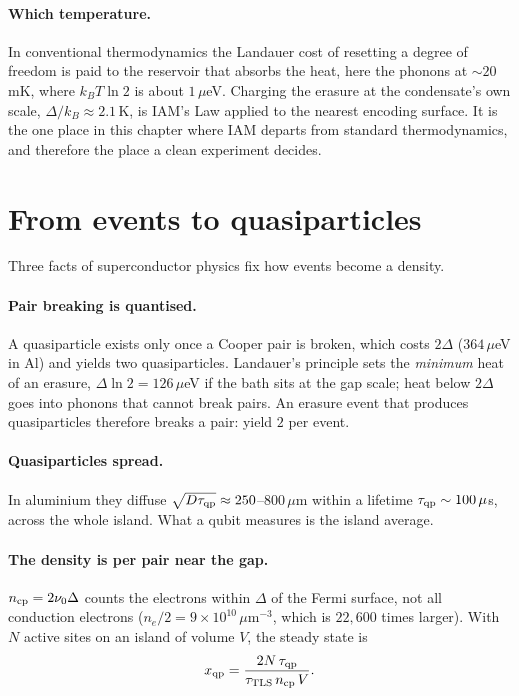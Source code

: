 \paragraph{Which temperature.} In conventional thermodynamics the Landauer cost of resetting a degree of freedom is paid to the reservoir that
absorbs the heat, here the phonons at $\sim20$\,mK, where $k_BT\ln2$ is about $1\,\mu$eV. Charging the erasure at the condensate's own scale,
$\Delta/k_B\approx2.1$\,K, is IAM's Law applied to the nearest encoding surface. It is the one place in this chapter where IAM departs from standard
thermodynamics, and therefore the place a clean experiment decides.

\section{From events to quasiparticles}
Three facts of superconductor physics fix how events become a density.
\paragraph{Pair breaking is quantised.} A quasiparticle exists only once a Cooper pair is broken, which costs $2\Delta$ ($364\,\mu$eV in Al) and yields
two quasiparticles. Landauer's principle sets the \emph{minimum} heat of an erasure, $\Delta\ln2=126\,\mu$eV if the bath sits at the gap scale;
heat below $2\Delta$ goes into phonons that cannot break pairs. An erasure event that produces quasiparticles therefore breaks a pair: yield $2$ per
event.
\paragraph{Quasiparticles spread.} In aluminium they diffuse $\sqrt{D\tau_{\rm qp}}\approx250$--$800\,\mu$m within a lifetime $\tau_{\rm qp}\sim100\,\mu$s,
across the whole island. What a qubit measures is the island average.
\paragraph{The density is per pair near the gap.} $n_{\rm cp}=2\nu_0\Delta$ counts the electrons within $\Delta$ of the Fermi surface, not all
conduction electrons ($n_e/2=9\times10^{10}\,\mu$m$^{-3}$, which is $22{,}600$ times larger).
With $N$ active sites on an island of volume $V$, the steady state is
\begin{equation}x_{\rm qp}=\frac{2N\,\tau_{\rm qp}}{\tau_{\rm TLS}\,n_{\rm cp}\,V}.\label{eq:xqp}\end{equation}


